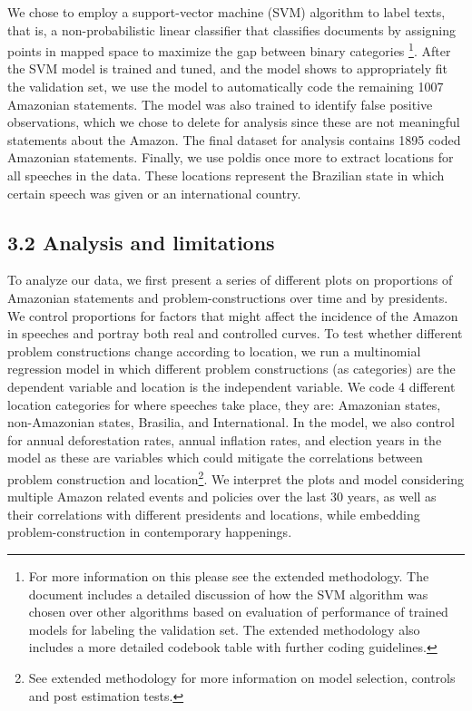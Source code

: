 \documentclass[]{interact}
\theoremstyle{plain}%
\theoremstyle{definition}
\theoremstyle{remark}
\begin{document}
We chose to employ a support-vector machine (SVM) algorithm to label
texts, that is, a non-probabilistic linear classifier that classifies
documents by assigning points in mapped space to maximize the gap
between binary categories \citep{meyer2021, noble2006}\footnote{For more
  information on this please see the extended methodology. The document
  includes a detailed discussion of how the SVM algorithm was chosen
  over other algorithms based on evaluation of performance of trained
  models for labeling the validation set. The extended methodology also
  includes a more detailed codebook table with further coding
  guidelines.}. After the SVM model is trained and tuned, and the model
shows to appropriately fit the validation set, we use the model to
automatically code the remaining 1007 Amazonian statements. The model
was also trained to identify false positive observations, which we chose
to delete for analysis since these are not meaningful statements about
the Amazon. The final dataset for analysis contains 1895 coded Amazonian
statements. Finally, we use poldis once more to extract locations for
all speeches in the data. These locations represent the Brazilian state
in which certain speech was given or an international country.

\hypertarget{analysis-and-limitations}{%
\subsection{3.2 Analysis and
limitations}\label{analysis-and-limitations}}

To analyze our data, we first present a series of different plots on
proportions of Amazonian statements and problem-constructions over time
and by presidents. We control proportions for factors that might affect
the incidence of the Amazon in speeches and portray both real and
controlled curves. To test whether different problem constructions
change according to location, we run a multinomial regression model in
which different problem constructions (as categories) are the dependent
variable and location is the independent variable. We code 4 different
location categories for where speeches take place, they are: Amazonian
states, non-Amazonian states, Brasilia, and International. In the model,
we also control for annual deforestation rates, annual inflation rates,
and election years in the model as these are variables which could
mitigate the correlations between problem construction and
location\footnote{See extended methodology for more information on model
  selection, controls and post estimation tests.}. We interpret the
plots and model considering multiple Amazon related events and policies
over the last 30 years, as well as their correlations with different
presidents and locations, while embedding problem-construction in
contemporary happenings.
\end{document}
